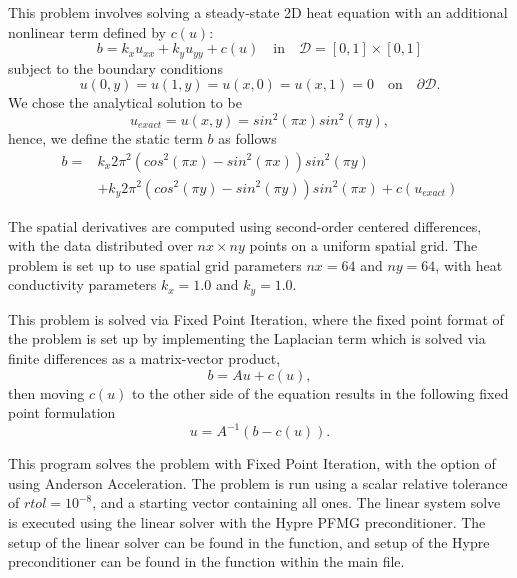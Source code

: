 This problem involves solving a steady-state 2D heat equation with an additional
nonlinear term defined by $c(u)$:
\begin{equation}
    b = k_x u_{xx} + k_y u_{yy} + c(u) \quad \text{in} \quad \mathcal{D}
        = [0,1] \times [0,1]
\end{equation}
subject to the boundary conditions
\begin{equation}
    u(0,y) = u(1,y) = u(x,0) = u(x,1) = 0 \quad \text{on} \quad \partial \mathcal{D}.
\end{equation}
We chose the analytical solution to be
\begin{equation}
    u_{exact} = u(x,y) = sin^2(\pi x) sin^2(\pi y),
\end{equation}
hence, we define the static term $b$ as follows
\begin{equation}
\begin{aligned}
    b = &k_x 2 \pi^2 (cos^2(\pi x) - sin^2(\pi x)) sin^2(\pi y) \\
        &+ k_y 2 \pi^2 (cos^2(\pi y) - sin^2(\pi y)) sin^2(\pi x) + c(u_{exact})
\end{aligned}
\end{equation}

The spatial derivatives are computed using second-order centered
differences, with the data distributed over $nx\times ny$ points
on a uniform spatial grid.  
The problem is set up to use spatial grid parameters $nx=64$ and
$ny=64$, with heat conductivity parameters $k_x=1.0$ and
$k_y=1.0$.  

This problem is solved via Fixed Point Iteration, where the fixed point format
of the problem is set up by implementing the Laplacian term which is solved
via finite differences as a matrix-vector product, 
\begin{equation}
    b = A u + c(u),
\end{equation}
then moving $c(u)$ to the other side of the equation results 
in the following fixed point formulation
\begin{equation}
    u = A^{-1} (b - c(u)).
\end{equation}

This program solves the problem with Fixed Point Iteration, 
with the option of using Anderson Acceleration.
The problem is run using a scalar relative
tolerance of $rtol=10^{-8}$, and a starting
vector containing all ones.
The linear system solve is executed using the
 linear solver with
the Hypre PFMG preconditioner. The setup of the
linear solver can be found in the
 function, and setup of the Hypre
preconditioner can be found in the
 function within the main file.

